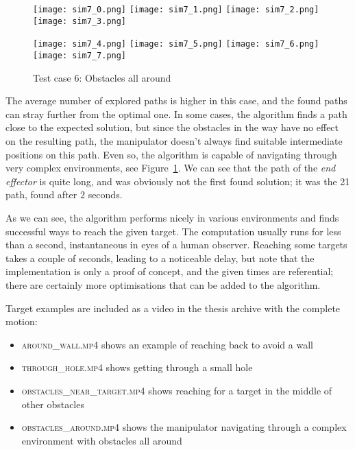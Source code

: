 \begin{figure}[h]
  \centering
  \begin{minipage}{\textwidth}
    \texttt{[image: sim7\_0.png]}
    \texttt{[image: sim7\_1.png]}
    \texttt{[image: sim7\_2.png]}
    \texttt{[image: sim7\_3.png]}

    \texttt{[image: sim7\_4.png]}
    \texttt{[image: sim7\_5.png]}
    \texttt{[image: sim7\_6.png]}
    \texttt{[image: sim7\_7.png]}
  \end{minipage}
  \caption{Test case 6: Obstacles all around}\label{fig:sim7}
\end{figure}

The average number of explored paths is higher in this case, and the found paths can stray further from the optimal one. In some cases, the algorithm finds a path close to the expected solution, but since the obstacles in the way have no effect on the resulting path, the manipulator doesn't always find suitable intermediate positions on this path. Even so, the algorithm is capable of navigating through very complex environments, see Figure~\ref{fig:sim7}. We can see that the path of the \textit{end effector} is quite long, and was obviously not the first found solution; it was the 21\st{} path, found after $2$ seconds.

As we can see, the algorithm performs nicely in various environments and finds successful ways to reach the given target. The computation usually runs for less than a second, instantaneous in eyes of a human observer. Reaching some targets takes a couple of seconds, leading to a noticeable delay, but note that the implementation is only a proof of concept, and the given times are referential; there are certainly more optimisations that can be added to the algorithm.

Target examples are included as a video in the thesis archive with the complete motion:

\begin{itemize}
\item \textsc{around\_wall.mp4} shows an example of reaching back to avoid a wall
\item \textsc{through\_hole.mp4} shows getting through a small hole
\item \textsc{obstacles\_near\_target.mp4} shows reaching for a target in the middle of other obstacles
\item \textsc{obstacles\_around.mp4} shows the manipulator navigating through a complex environment with obstacles all around
\end{itemize}

